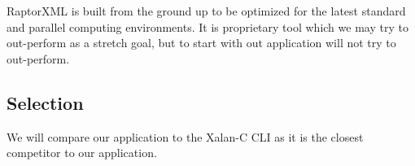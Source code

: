 RaptorXML is built from the ground up to be optimized for the latest standard and parallel computing environments.
It is proprietary tool which we may try to out-perform as a stretch goal, but to start with out application will not try to out-perform.

\subsection{Selection}

We will compare our application to the Xalan-C CLI as it is the closest competitor to our application.
